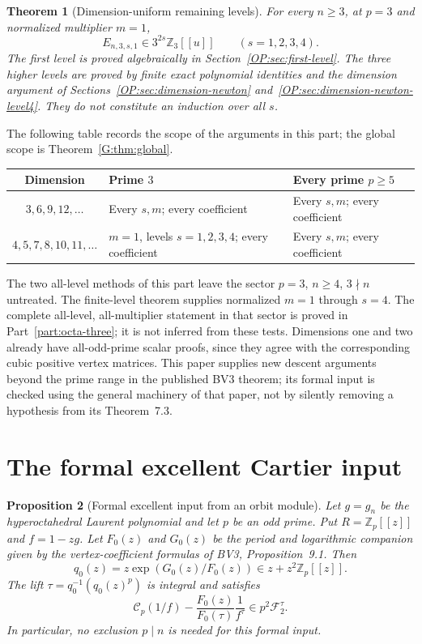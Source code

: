 \documentclass[11pt,a4paper]{article}
\newtheorem{theorem}{Theorem}[section]
\newtheorem{proposition}[theorem]{Proposition}
\theoremstyle{definition}\newtheorem{definition}[theorem]{Definition}
\theoremstyle{remark}\newtheorem{remark}[theorem]{Remark}
\numberwithin{equation}{section}
\begin{document}
\begin{theorem}[Dimension-uniform remaining levels]\label{OP:thm:finite-scope}
For every $n\ge3$, at $p=3$ and normalized multiplier $m=1$,
\[
 E_{n,3,s,1}\in3^{2s}\mathbb Z_3[[u]]\qquad(s=1,2,3,4).
\]
The first level is proved algebraically in Section~\ref{OP:sec:first-level}.
The three higher levels are proved by finite exact polynomial identities
and the dimension argument of Sections~\ref{OP:sec:dimension-newton} and~\ref{OP:sec:dimension-newton-level4}.
They do not constitute an induction over all $s$.
\end{theorem}

The following table records the scope of the arguments in this part;
the global scope is Theorem~\ref{G:thm:global}.
\begin{center}\small
\begin{tabular}{c|p{57mm}|p{48mm}}
\toprule
Dimension & Prime $3$ & Every prime $p\ge5$\\\midrule
$3,6,9,12,\ldots$ & Every $s,m$; every coefficient & Every $s,m$; every coefficient\\
$4,5,7,8,10,11,\ldots$ & $m=1$, levels $s=1,2,3,4$; every coefficient & Every $s,m$; every coefficient\\
\bottomrule
\end{tabular}
\end{center}
The two all-level methods of this part leave the sector
$p=3$, $n\ge4$, $3\nmid n$ untreated. The finite-level
theorem supplies normalized $m=1$ through $s=4$. The complete
all-level, all-multiplier statement in that sector is proved in
Part~\ref{part:octa-three}; it is not inferred from these tests.
Dimensions one and two already have all-odd-prime scalar
proofs, since they agree with the corresponding cubic positive vertex
matrices. This paper supplies new descent arguments beyond the prime
range in the published BV3 theorem; its formal input is checked using
the general machinery of that paper, not by silently removing a
hypothesis from its Theorem~7.3.
\section{The formal excellent Cartier input}\label{OP:source-main-2}\label{OP:sec:formal-input}
\begin{proposition}[Formal excellent input from an orbit module]\label{OP:prop:orbit}
Let $g=g_n$ be the hyperoctahedral Laurent polynomial and let $p$ be an odd prime.
Put $R=\mathbb Z_p[[z]]$ and $f=1-zg$.
Let $F_0(z)$ and $G_0(z)$ be the period and logarithmic companion
given by the vertex-coefficient formulas of BV3, Proposition~9.1.
Then
\[
 q_0(z)=z\exp(G_0(z)/F_0(z))\in z+z^2\mathbb Z_p[[z]].
\]
The lift $\tau=q_0^{-1}(q_0(z)^p)$ is integral and satisfies
\[
 \mathscr C_p(1/f)-\frac{F_0(z)}{F_0(\tau)}\frac1{f^\tau}
 \in p^2\mathscr F_2^\tau.
\]
In particular, no exclusion $p\mid n$ is needed for this formal input.
\end{proposition}
\end{document}
